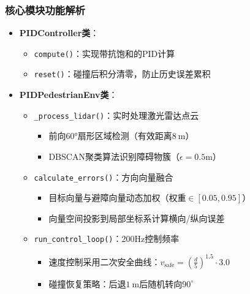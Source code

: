 \subsubsection{核心模块功能解析}
\begin{itemize}
    \item \textbf{PIDController类}：
    \begin{itemize}
        \item \texttt{compute()}：实现带抗饱和的PID计算
        \item \texttt{reset()}：碰撞后积分清零，防止历史误差累积
    \end{itemize}
    
    \item \textbf{PIDPedestrianEnv类}：
    \begin{itemize}
        \item \texttt{\_process\_lidar()}：实时处理激光雷达点云
        \begin{itemize}
            \item 前向60°扇形区域检测（有效距离$8\ \text{m}$）
            \item DBSCAN聚类算法识别障碍物簇（$\epsilon=0.5$m）
        \end{itemize}
        
        \item \texttt{calculate\_errors()}：方向向量融合
        \begin{itemize}
            \item 目标向量与避障向量动态加权（权重$\in[0.05,0.95]$）
            \item 向量空间投影到局部坐标系计算横向/纵向误差
        \end{itemize}
        
        \item \texttt{run\_control\_loop()}：200Hz控制频率
        \begin{itemize}
            \item 速度控制采用二次安全曲线：$v_{\text{safe}} = (\frac{d}{5})^{1.5} \cdot 3.0$
            \item 碰撞恢复策略：后退$1\ \text{m}$后随机转向$90^\circ$
        \end{itemize}
    \end{itemize}
\end{itemize}

